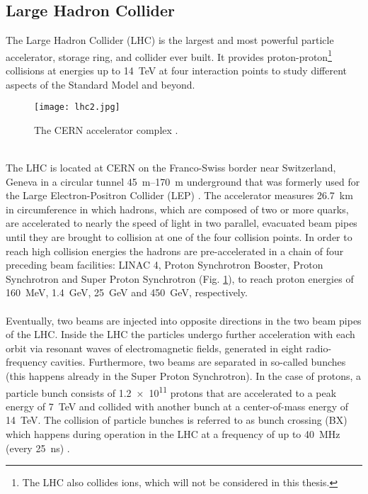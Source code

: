 \documentclass[../../main.tex]{subfiles}
\begin{document}
\subsection{Large Hadron Collider}\label{sec:lhc}
The Large Hadron Collider (LHC) \cite{lhc1, lhc2, lhc3} is the largest and most powerful particle accelerator, storage ring, and collider ever built. It provides proton-proton\footnote{The LHC also collides ions, which will not be considered in this thesis.} collisions at energies up to \SI{14}{TeV} at four interaction points to study different aspects of the Standard Model and beyond.\\
\begin{figure}[htp]
	\begin{center}
		\texttt{[image: lhc2.jpg]}
		\caption{The CERN accelerator complex \cite{lhc_ff}.}
		\label{fig:lhc}
	\end{center}
\end{figure}
\\
The LHC is located at CERN on the Franco-Swiss border near Switzerland, Geneva in a circular tunnel \SIrange{45}{170}{m} underground that was formerly used for the Large Electron-Positron Collider (LEP) \cite{amann02}. The accelerator measures \SI{26.7}{km} in circumference in which hadrons, which are composed of two or more quarks, are accelerated to nearly the speed of light in two parallel, evacuated beam pipes until they are brought to collision at one of the four collision points. In order to reach high collision energies the hadrons are pre-accelerated in a chain of four preceding beam facilities: LINAC 4, Proton Synchrotron Booster, Proton Synchrotron and Super Proton Synchrotron (Fig. \ref{fig:lhc}), to reach proton energies of \SI{160}{MeV}, \SI{1.4}{GeV}, \SI{25}{GeV} and \SI{450}{GeV}, respectively.\\
\\
Eventually, two beams are injected into opposite directions in the two beam pipes of the LHC. Inside the LHC the particles undergo further acceleration with each orbit via resonant waves of electromagnetic fields, generated in eight radio-frequency cavities. Furthermore, two beams are separated in so-called bunches (this happens already in the Super Proton Synchrotron). In the case of protons, a particle bunch consists of \num{1.2e11} protons that are accelerated to a peak energy of \SI{7}{TeV} and collided with another bunch at a center-of-mass energy of \SI{14}{TeV}. The collision of particle bunches is referred to as bunch crossing (BX) which happens during operation in the LHC at a frequency of up to \SI{40}{MHz} (every \SI{25}{ns}) \cite{lhc_ff}.\\
\end{document}
